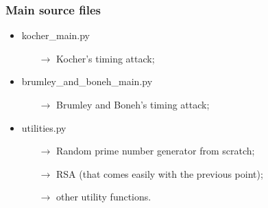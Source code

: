 \documentclass{beamer}
\begin{document}
\begin{frame}
\frametitle{Main source files}

\begin{itemize}
  \item kocher\_main.py
  \begin{itemize}
    \item[$\rightarrow$] Kocher's timing attack;
  \end{itemize}
  \item brumley\_and\_boneh\_main.py
  \begin{itemize}
    \item[$\rightarrow$] Brumley and Boneh's timing attack;
  \end{itemize}
  \item utilities.py
  \begin{itemize}
    \item[$\rightarrow$] Random prime number generator from scratch;
    \item[$\rightarrow$] RSA (that comes easily with the previous point);
    \item[$\rightarrow$] other utility functions.
  \end{itemize}
\end{itemize}

\end{frame}
\end{document}
